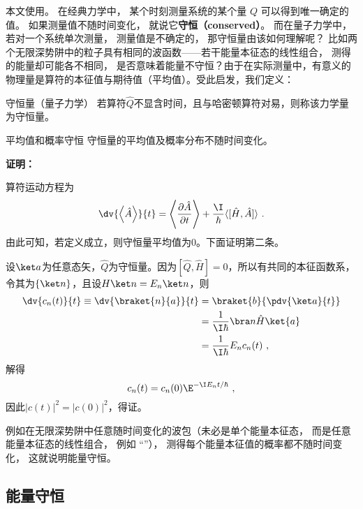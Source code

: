 
本文使用。 在经典力学中， 某个时刻测量系统的某个量 $Q$ 可以得到唯一确定的值。 如果测量值不随时间变化， 就说它\textbf{守恒（conserved）}。 而在量子力学中， 若对一个系统单次测量， 测量值是不确定的， 那守恒量由该如何理解呢？ 比如两个无限深势阱中的粒子具有相同的波函数——若干能量本征态的线性组合， 测得的能量却可能各不相同， 是否意味着能量不守恒？由于在实际测量中，有意义的物理量是算符的本征值与期待值（平均值）。受此启发，我们定义：
\begin{definition}{守恒量（量子力学）}\label{def_QMcons_1}
若算符$\hat Q$不显含时间，且与哈密顿算符对易，则称该力学量为守恒量。
\end{definition}
\begin{corollary}{平均值和概率守恒}
守恒量的平均值及概率分布不随时间变化。
\end{corollary}
\textbf{证明：}

算符运动方程为
\begin{equation}
\dv{\left\langle \hat A \right\rangle}{t}=\left\langle\frac{\partial \hat A}{\partial t}\right\rangle+\frac{\I}{\hbar}\langle[\hat H, \hat A]\rangle~.
\end{equation}
由此可知，若定义成立，则守恒量平均值为0。下面证明第二条。

设$\ket a$为任意态矢，$\hat Q$为守恒量。因为$[\hat Q,\hat H]=0$，所以有共同的本征函数系，令其为$\{\ket n\}$，且设$H\ket n=E_n\ket n$，则
\begin{equation}
\begin{aligned}
\dv{c_n(t)}{t}\equiv\dv{\braket{n}{a}}{t}&=\braket{b}{\pdv{\ket a}{t}}\\
&=\frac{1}{\I\hbar}\bra n \hat H\ket{a}\\
&=\frac{1}{\I\hbar}E_nc_n(t)~,
\end{aligned}
\end{equation}
解得
\begin{equation}
c_n(t)=c_n(0)\E^{-\I E_n t/\hbar }~,
\end{equation}
因此$|c(t)|^2=|c(0)|^2$，得证。

例如在无限深势阱中任意随时间变化的波包（未必是单个能量本征态， 而是任意能量本征态的线性组合， 例如 “”）， 测得每个能量本征值的概率都不随时间变化， 这就说明能量守恒。
\subsection{能量守恒}

